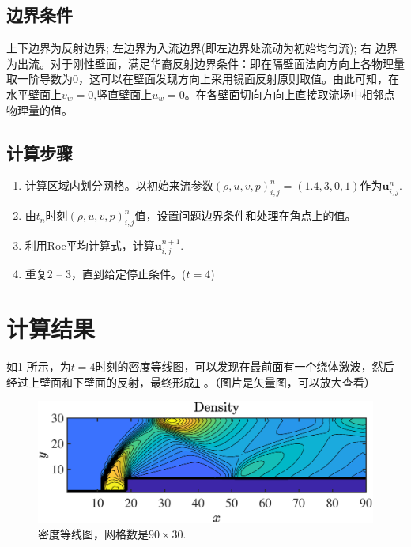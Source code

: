 \documentclass[12pt]{article}
\begin{document}
\subsection{边界条件}

上下边界为反射边界; 左边界为入流边界(即左边界处流动为初始均匀流); 右 边界为出流。对于刚性壁面，满足华裔反射边界条件：即在隔壁面法向方向上各物理量取一阶导数为0，这可以在壁面发现方向上采用镜面反射原则取值。由此可知，在水平壁面上$v_w=0$,竖直壁面上$u_w=0$。在各壁面切向方向上直接取流场中相邻点物理量的值。\cite[P339]{cfd}


\subsection{计算步骤}

\begin{enumerate}
	\item 计算区域内划分网格。以初始来流参数$(\rho,u,v,p)^n_{i,j} = (1.4,3,0,1)$作为$\bm{u}^n_{i,j}$.
	\item 由$t_n$时刻$(\rho,u,v,p)^n_{i,j}$值，设置问题边界条件和处理在角点上的值。
	\item 利用Roe平均计算式，计算$\bm{u}^{n+1}_{i,j}$.
	\item 重复2 -- 3，直到给定停止条件。($t=4$)
\end{enumerate}

\section{计算结果}

如\cref{fig:density} 所示，为$t=4$时刻的密度等线图，可以发现在最前面有一个绕体激波，然后经过上壁面和下壁面的反射，最终形成\cref{fig:density} 。（图片是矢量图，可以放大查看）







\begin{figure}[htp]
	\centering
	\includegraphics[width=14cm]{density.eps}
	\caption{密度等线图，网格数是$90\times 30$.}
	\label{fig:density}
\end{figure}






\end{document}
